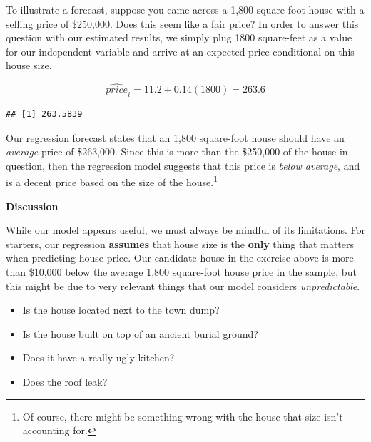 \documentclass[
]{book}
\newenvironment{Shaded}{\begin{snugshade}}{\end{snugshade}}
\newcommand{\AttributeTok}[1]{\textcolor[rgb]{0.13,0.29,0.53}{#1}}
\newcommand{\DecValTok}[1]{\textcolor[rgb]{0.00,0.00,0.81}{#1}}
\newcommand{\FunctionTok}[1]{\textcolor[rgb]{0.13,0.29,0.53}{\textbf{#1}}}
\newcommand{\NormalTok}[1]{#1}
\newcommand{\OtherTok}[1]{\textcolor[rgb]{0.56,0.35,0.01}{#1}}
\newcommand{\SpecialCharTok}[1]{\textcolor[rgb]{0.81,0.36,0.00}{\textbf{#1}}}
\begin{document}
To illustrate a forecast, suppose you came across a 1,800 square-foot house with a selling price of \$250,000. Does this seem like a fair price? In order to answer this question with our estimated results, we simply plug 1800 square-feet as a value for our independent variable and arrive at an expected price conditional on this house size.

\[\widehat{price}_i=11.2+0.14(1800)=263.6\]

\begin{Shaded}
\end{Shaded}

\begin{verbatim}
## [1] 263.5839
\end{verbatim}

Our regression forecast states that an 1,800 square-foot house should have an \emph{average} price of \$263,000. Since this is more than the \$250,000 of the house in question, then the regression model suggests that this price is \emph{below average}, and is a decent price based on the size of the house.\footnote{Of course, there might be something wrong with the house that size isn't accounting for.}

\textbf{Discussion}

While our model appears useful, we must always be mindful of its limitations. For starters, our regression \textbf{assumes} that house size is the \textbf{only} thing that matters when predicting house price. Our candidate house in the exercise above is more than \$10,000 below the average 1,800 square-foot house price in the sample, but this might be due to very relevant things that our model considers \emph{unpredictable}.

\begin{itemize}
\item
  Is the house located next to the town dump?
\item
  Is the house built on top of an ancient burial ground?
\item
  Does it have a really ugly kitchen?
\item
  Does the roof leak?
\end{itemize}
\end{document}
